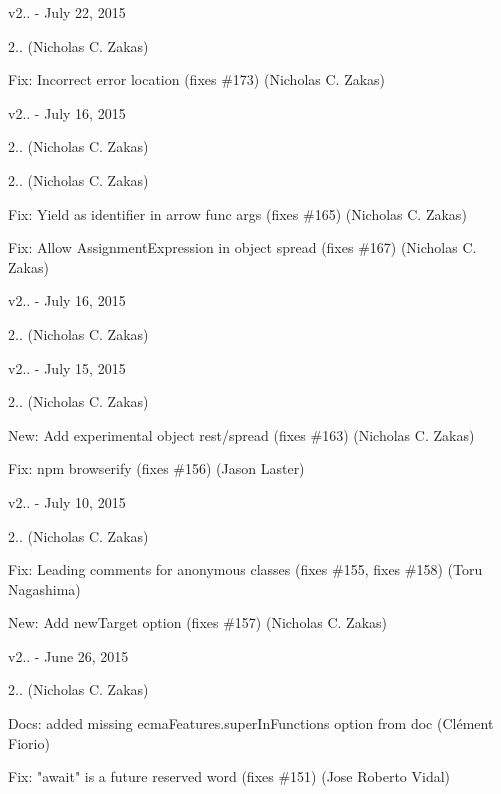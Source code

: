 v2.. -\/ July 22, 2015


\begin{DoxyItemize}
\item 2.. (Nicholas C. Zakas)
\item Fix\+: Incorrect error location (fixes \#173) (Nicholas C. Zakas)
\end{DoxyItemize}

v2.. -\/ July 16, 2015


\begin{DoxyItemize}
\item 2.. (Nicholas C. Zakas)
\item 2.. (Nicholas C. Zakas)
\item Fix\+: Yield as identifier in arrow func args (fixes \#165) (Nicholas C. Zakas)
\item Fix\+: Allow Assignment\+Expression in object spread (fixes \#167) (Nicholas C. Zakas)
\end{DoxyItemize}

v2.. -\/ July 16, 2015


\begin{DoxyItemize}
\item 2.. (Nicholas C. Zakas)
\end{DoxyItemize}

v2.. -\/ July 15, 2015


\begin{DoxyItemize}
\item 2.. (Nicholas C. Zakas)
\item New\+: Add experimental object rest/spread (fixes \#163) (Nicholas C. Zakas)
\item Fix\+: npm browserify (fixes \#156) (Jason Laster)
\end{DoxyItemize}

v2.. -\/ July 10, 2015


\begin{DoxyItemize}
\item 2.. (Nicholas C. Zakas)
\item Fix\+: Leading comments for anonymous classes (fixes \#155, fixes \#158) (Toru Nagashima)
\item New\+: Add new\+Target option (fixes \#157) (Nicholas C. Zakas)
\end{DoxyItemize}

v2.. -\/ June 26, 2015


\begin{DoxyItemize}
\item 2.. (Nicholas C. Zakas)
\item Docs\+: added missing {\ttfamily ecma\+Features.\+super\+In\+Functions} option from doc (Clément Fiorio)
\item Fix\+: "{}await"{} is a future reserved word (fixes \#151) (Jose Roberto Vidal)
\end{DoxyItemize}

